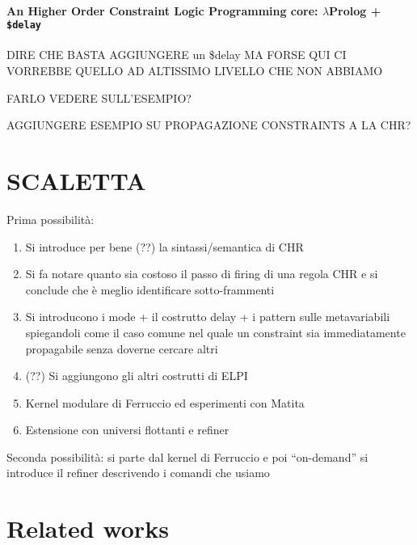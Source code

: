 \documentclass{easychair}
\begin{document}
\paragraph{An Higher Order Constraint Logic Programming core: $\lambda$Prolog + \texttt{\$delay}}

DIRE CHE BASTA AGGIUNGERE un \$delay MA FORSE QUI CI VORREBBE QUELLO AD ALTISSIMO LIVELLO CHE NON ABBIAMO

FARLO VEDERE SULL'ESEMPIO?

AGGIUNGERE ESEMPIO SU PROPAGAZIONE CONSTRAINTS A LA CHR?

\section{SCALETTA}

Prima possibilità:
\begin{enumerate}
\item Si introduce per bene (??) la sintassi/semantica di CHR
\item Si fa notare quanto sia costoso il passo di firing di una regola CHR
      e si conclude che è meglio identificare sotto-frammenti
\item Si introducono i mode + il costrutto delay + i pattern sulle metavariabili
      spiegandoli come il caso comune nel quale un constraint sia immediatamente
      propagabile senza doverne cercare altri
\item (??) Si aggiungono gli altri costrutti di ELPI
\item Kernel modulare di Ferruccio ed esperimenti con Matita
\item Estensione con universi flottanti e refiner
\end{enumerate}

Seconda possibilità: si parte dal kernel di Ferruccio e poi ``on-demand'' si introduce il refiner descrivendo i comandi che usiamo 

\section{Related works}

\label{sect:bib}


\end{document}
